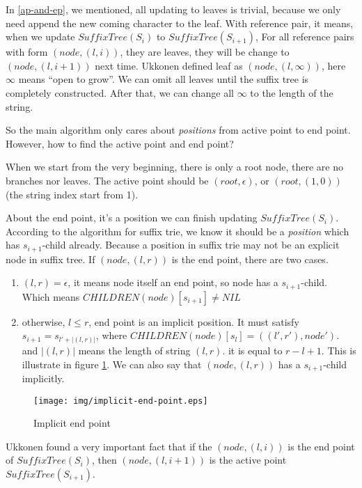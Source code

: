 \documentclass{article}
\begin{document}
In \ref{ap-and-ep}, we mentioned, all updating to leaves is trivial, because we
only need append the new coming character to the leaf. With reference pair,
it means, when we update $SuffixTree(S_i)$ to $SuffixTree(S_{i+1})$, 
For all reference pairs with form $(node, (l, i))$, they are leaves, they will
be change to $(node, (l, i+1))$ next time. Ukkonen defined leaf as
$(node, (l, \infty))$, here $\infty$ means ``open to grow''. We can omit all 
leaves until the suffix tree is completely constructed. After that, we can 
change all $\infty$ to the length of the string.

So the main algorithm only cares about {\em positions} from active point
to end point. However, how to find the active point and end point?

When we start from the very beginning, there is only a root node, there are
no branches nor leaves. The active point should be $(root, \epsilon)$, or
$(root, (1, 0))$ (the string index start from 1).

About the end point, it's a position we can finish updating $SuffixTree(S_i)$.
According to the algorithm for suffix trie, we know it should be a
{\em position} which has $s_{i+1}$-child already. Because a position
in suffix trie may not be an explicit node in suffix tree. If $(node, (l, r))$
is the end point, there are two cases.

\begin{enumerate}
\item $(l, r)=\epsilon$, it means node itself an end point, so node has a 
$s_{i+1}$-child. Which means $CHILDREN(node)[s_{i+1}] \ne NIL$
\item otherwise, $l \leq r$, end point is an implicit position. 
It must satisfy $s_{i+1}=s_{l'+|(l, r)|}$, where $CHILDREN(node)[s_l]=((l', r'), node')$.
and $|(l, r)|$ means the length of string $(l, r)$. it is equal to $r-l+1$.
This is illustrate in figure \ref{fig:implicit-end-point}. We can
also say that $(node, (l, r))$ has a $s_{i+1}$-child implicitly.
\end{enumerate}

\begin{figure}[htbp]
   \begin{center}
     \texttt{[image: img/implicit-end-point.eps]}
     \caption{Implicit end point}
     \label{fig:implicit-end-point}
   \end{center}
\end{figure}

Ukkonen found a very important fact that if the $(node, (l, i))$ is the end
point of $SuffixTree(S_i)$, then $(node, (l, i+1))$ is the active point 
$SuffixTree(S_{i+1})$.
\end{document}
